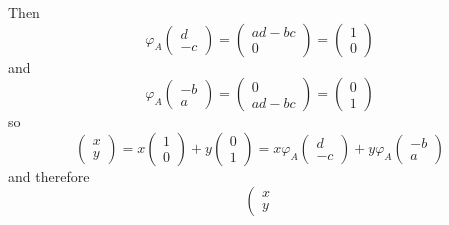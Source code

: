 \documentclass{article}
\begin{document}
\begin{Answer}
\begin{enumerate}
{\begin{itemize}
{        Then
        $$
        \varphi_A
          \left(\begin{array}{r}
            d \\ -c
          \end{array}\right) =
          \left(\begin{array}{c}
            ad - bc \\ 0
          \end{array}\right) =
          \left(\begin{array}{c}
            1 \\ 0
          \end{array}\right)
        $$
        and
        $$
        \varphi_A
          \left(\begin{array}{r}
            -b \\ a
          \end{array}\right) =
          \left(\begin{array}{c}
            0 \\ ad - bc
          \end{array}\right) =
          \left(\begin{array}{c}
            0 \\ 1
          \end{array}\right)
        $$
        so
        $$
        \left(\begin{array}{c}
          x \\ y
        \end{array}\right) =
          x
          \left(\begin{array}{c}
            1 \\ 0
          \end{array}\right) +
          y
          \left(\begin{array}{c}
            0 \\ 1
          \end{array}\right) =
          x \varphi_A
          \left(\begin{array}{r}
            d \\ -c
          \end{array}\right) +
          y \varphi_A
          \left(\begin{array}{r}
            -b \\ a
          \end{array}\right)
        $$
        and therefore
        $$
        \left(\begin{array}{c}
          x \\ y

\end{array}$$}
\end{itemize}}
\end{enumerate}
\end{Answer}
\end{document}
